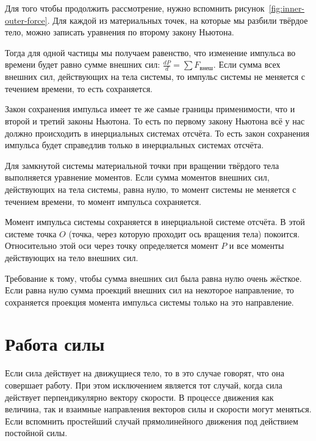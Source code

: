 Для того чтобы продолжить рассмотрение, нужно вспомнить
рисунок~\ref{fig:inner-outer-force}. Для каждой из материальных точек, на
которые мы разбили твёрдое тело, можно записать уравнения по второму закону
Ньютона.

\begin{theorem}\label{thrm:keep-moment-impuls}
	Тогда для одной частицы мы получаем равенство, что изменение
	импульса во времени
	будет равно сумме внешних сил: \( \frac{d P}{d} = \sum F_\text{внеш} \). Если
	сумма всех внешних сил, действующих на тела системы, то импульс системы не
	меняется с течением времени, то есть сохраняется.

	\begin{corollary}
		Закон сохранения импульса имеет те же самые границы применимости,
		что и второй
		и третий законы Ньютона. То есть по первому закону Ньютона всё у нас должно
		происходить в инерциальных системах отсчёта. То есть закон
		сохранения импульса
		будет справедлив только в инерциальных системах отсчёта.
	\end{corollary}

	Для замкнутой системы материальной точки при вращении твёрдого тела
	выполняется
	уравнение моментов. Если сумма моментов внешних сил, действующих на тела
	системы, равна нулю, то момент системы не меняется с течением времени, то
	момент импульса сохраняется.

	\begin{corollary}
		Момент импульса системы сохраняется в инерциальной системе отсчёта. В этой
		системе точка $O$ (точка, через которую проходит ось вращения
		тела) покоится.
		Относительно этой оси через точку определяется момент $P$ и все моменты
		действующих на тело внешних сил.
	\end{corollary}

	\begin{corollary}
		Требование к тому, чтобы сумма внешних сил была равна нулю очень жёсткое.
		Если равна нулю сумма проекций внешних сил на некоторое направление, то
		сохраняется проекция момента импульса системы только на это направление.
	\end{corollary}

\end{theorem}

\section{Работа силы}%

Если сила действует на движущиеся тело, то в это случае говорят, что она
совершает работу. При этом исключением является тот случай, когда сила
действует перпендикулярно вектору скорости. В процессе движения как величина,
так и взаимные направления векторов силы и скорости могут меняться. Если
вспомнить простейший случай прямолинейного движения под действием постойной
силы.

